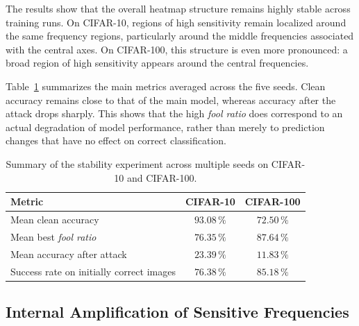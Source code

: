 The results show that the overall heatmap structure remains highly stable across training runs.
On CIFAR-10, regions of high sensitivity remain localized around the same frequency regions,
particularly around the middle frequencies associated with the central axes. On CIFAR-100, this structure
is even more pronounced: a broad region of high sensitivity appears around the central frequencies.


Table~\ref{tab:stability_multiseed_metrics} summarizes the main metrics averaged across the five
seeds. Clean accuracy remains close to that of the main model, whereas accuracy after the attack
drops sharply. This shows that the high \textit{fool ratio} does correspond to an actual degradation
of model performance, rather than merely to prediction changes that have no effect on
correct classification.

\begin{table}[H]
    \centering
    \begin{tabular}{l|c|c}
        \hline
        Metric & CIFAR-10 & CIFAR-100 \\
        \hline
        Mean clean accuracy & $93.08\,\%$ & $72.50\,\%$ \\
        Mean best \textit{fool ratio} & $76.35\,\%$ & $87.64\,\%$ \\
        Mean accuracy after attack & $23.39\,\%$ & $11.83\,\%$ \\
        Success rate on initially correct images & $76.38\,\%$ & $85.18\,\%$ \\
        \hline
    \end{tabular}
    \caption{Summary of the stability experiment across multiple seeds on CIFAR-10 and CIFAR-100.}
    \label{tab:stability_multiseed_metrics}
\end{table}

\subsection{Internal Amplification of Sensitive Frequencies}
\label{subsec:amplification_interne_sfa}


